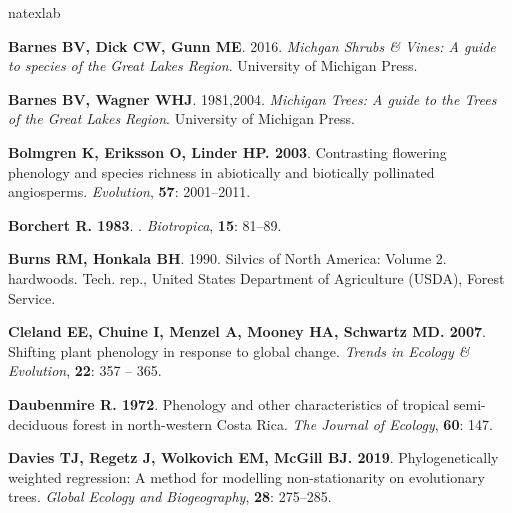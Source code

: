 \documentclass[11pt]{article}
\begin{document}
%
\begin{thebibliography}{39}
\expandafter\ifx\csname natexlab\endcsname\relax\def\natexlab#1{#1}\fi

{\bf Barnes BV, Dick CW, Gunn ME}. 2016.
\newblock \emph{Michgan Shrubs & Vines: A guide to species of the Great Lakes
Region}.
\newblock University of Michigan Press.

{\bf Barnes BV, Wagner WHJ}. 1981,2004.
\newblock \emph{Michigan Trees: A guide to the Trees of the Great Lakes
Region}.
\newblock University of Michigan Press.

{\bf Bolmgren K, Eriksson O, Linder HP}{\bf . 2003}.
\newblock Contrasting flowering phenology and species richness in abiotically
and biotically pollinated angiosperms.
\newblock \emph{Evolution}, {\bf 57}: 2001--2011.

{\bf Borchert R}{\bf . {1983}}.
.
\newblock \emph{{Biotropica}}, {\bf {15}}: {81--89}.

{\bf Burns RM, Honkala BH}. 1990.
\newblock Silvics of North America: Volume 2. hardwoods.
\newblock Tech. rep., United States Department of Agriculture (USDA), Forest
Service.

{\bf Cleland EE, Chuine I, Menzel A, Mooney HA, Schwartz MD}{\bf . 2007}.
\newblock Shifting plant phenology in response to global change.
\newblock \emph{Trends in Ecology & Evolution}, {\bf 22}: 357 -- 365.

{\bf Daubenmire R}{\bf . 1972}.
\newblock Phenology and other characteristics of tropical semi-deciduous forest
in north-western Costa Rica.
\newblock \emph{The Journal of Ecology}, {\bf 60}: 147.

{\bf Davies TJ, Regetz J, Wolkovich EM, McGill BJ}{\bf . 2019}.
\newblock Phylogenetically weighted regression: A method for modelling
non-stationarity on evolutionary trees.
\newblock \emph{Global Ecology and Biogeography}, {\bf 28}: 275--285.


\end{thebibliography}
\end{document}
